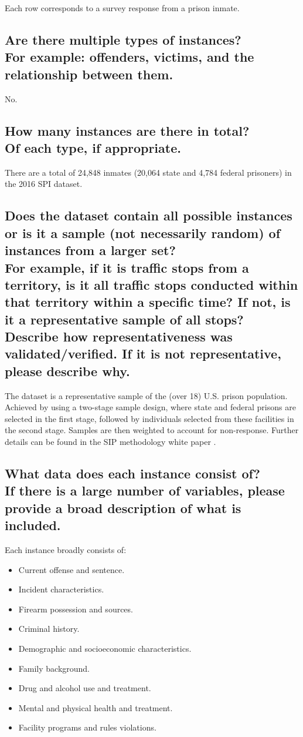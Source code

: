 \documentclass[letterpaper, 10 pt, conference]{ieeeconf}  %
\newcommand{\subtitle}[1]{{\\ \small \normalfont \color{purple} #1}}
\begin{document}
Each row corresponds to a survey response from a prison inmate.

\subsection{Are there multiple types of instances? \subtitle{For example: offenders, victims, and the relationship between them.}}

No.

\subsection{How many instances are there in total? \subtitle{Of each type, if appropriate.}}

There are a total of 24,848 inmates (20,064 state and 4,784 federal prisoners) in the 2016 SPI dataset.

\subsection{Does the dataset contain all possible instances or is it a sample (not necessarily random) of instances from a larger set? \subtitle{For example, if it is traffic stops from a territory, is it all traffic stops conducted within that territory within a specific time? If not, is it a representative sample of all stops? Describe how representativeness was validated/verified. If it is not representative, please describe why.}}

The dataset is a representative sample of the (over 18) U.S. prison population. Achieved by using a two-stage sample design, where state and federal prisons are selected in the first stage, followed by individuals selected from these facilities in the second stage. Samples are then weighted to account for non-response. Further details can be found in the SIP methodology white paper \cite{glaze2019methodology}.

\subsection{What data does each instance consist of? \subtitle{If there is a large number of variables, please provide a broad description of what is included.}}

Each instance broadly consists of:

\begin{itemize}
    \item Current offense and sentence.
    \item Incident characteristics.
    \item Firearm possession and sources.
    \item Criminal history.
    \item Demographic and socioeconomic characteristics.
    \item Family background.
    \item Drug and alcohol use and treatment.
    \item Mental and physical health and treatment.
    \item Facility programs and rules violations.
\end{itemize}
\end{document}
